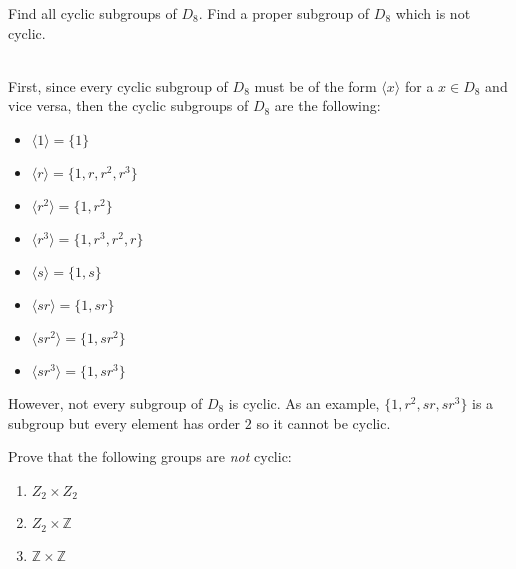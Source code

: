 \begin{exercise}
    Find all cyclic subgroups of $D_8$. Find a proper subgroup of $D_8$
    which is not cyclic. \\
\end{exercise}

\begin{solution}
    \\First, since every cyclic subgroup of $D_8$ must be of the form $\langle
    x\rangle$ for a $x\in D_8$ and vice versa, then the cyclic subgroups
    of $D_8$ are the following:
    \begin{itemize}
        \item $\langle 1 \rangle = \{1\}$
        \item $\langle r \rangle = \{1,r,r^2,r^3\}$
        \item $\langle r^2 \rangle = \{1,r^2\}$
        \item $\langle r^3 \rangle = \{1,r^3,r^2,r\}$
        \item $\langle s \rangle = \{1,s\}$
        \item $\langle sr \rangle = \{1,sr\}$
        \item $\langle sr^2 \rangle = \{1,sr^2\}$
        \item $\langle sr^3 \rangle = \{1,sr^3\}$
    \end{itemize}
    However, not every subgroup of $D_8$ is cyclic. As an example, $\{1,
    r^2, sr, sr^3\}$ is a subgroup but every element has order $2$ so it
    cannot be cyclic.\\
\end{solution}

\begin{exercise}
    Prove that the following groups are \textit{not} cyclic:
    \begin{enumerate}[label=(\alph*)]
        \item $Z_2\times Z_2$
        \item $Z_2\times \mathbb{Z}$
        \item $\mathbb{Z}\times \mathbb{Z}$\\
    \end{enumerate}
\end{exercise}

